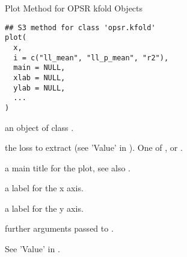 %
\begin{Description}
Plot Method for OPSR kfold Objects
\end{Description}
%
\begin{Usage}
\begin{verbatim}
## S3 method for class 'opsr.kfold'
plot(
  x,
  i = c("ll_mean", "ll_p_mean", "r2"),
  main = NULL,
  xlab = NULL,
  ylab = NULL,
  ...
)
\end{verbatim}
\end{Usage}
%
\begin{Arguments}
\begin{ldescription}
\item[\code{x}] an object of class .

\item[\code{i}] the loss to extract (see 'Value' in ). One of ,
 or .

\item[\code{main}] a main title for the plot, see also .

\item[\code{xlab}] a label for the x axis.

\item[\code{ylab}] a label for the y axis.

\item[\code{...}] further arguments passed to .
\end{ldescription}
\end{Arguments}
%
\begin{Value}
See 'Value' in .
\end{Value}
%
\begin{SeeAlso}
\end{SeeAlso}


